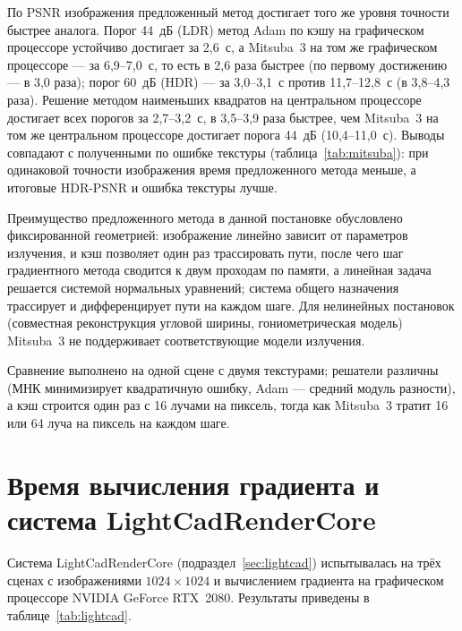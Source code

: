 По PSNR изображения предложенный метод достигает того же уровня точности быстрее аналога. Порог 44~дБ (LDR) метод Adam по кэшу на графическом процессоре устойчиво достигает за 2,6~с, а Mitsuba~3 на том же графическом процессоре --- за 6,9--7,0~с, то есть в 2,6 раза быстрее (по первому достижению --- в 3,0 раза); порог 60~дБ (HDR) --- за 3,0--3,1~с против 11,7--12,8~с (в 3,8--4,3 раза). Решение методом наименьших квадратов на центральном процессоре достигает всех порогов за 2,7--3,2~с, в 3,5--3,9 раза быстрее, чем Mitsuba~3 на том же центральном процессоре достигает порога 44~дБ (10,4--11,0~с). Выводы совпадают с полученными по ошибке текстуры (таблица~\ref{tab:mitsuba}): при одинаковой точности изображения время предложенного метода меньше, а итоговые HDR-PSNR и ошибка текстуры лучше.

Преимущество предложенного метода в данной постановке обусловлено фиксированной геометрией: изображение линейно зависит от параметров излучения, и кэш позволяет один раз трассировать пути, после чего шаг градиентного метода сводится к двум проходам по памяти, а линейная задача решается системой нормальных уравнений; система общего назначения трассирует и дифференцирует пути на каждом шаге. Для нелинейных постановок (совместная реконструкция угловой ширины, гониометрическая модель) Mitsuba~3 не поддерживает соответствующие модели излучения.

Сравнение выполнено на одной сцене с двумя текстурами; решатели различны (МНК минимизирует квадратичную ошибку, Adam --- средний модуль разности), а кэш строится один раз с 16 лучами на пиксель, тогда как Mitsuba~3 тратит 16 или 64 луча на пиксель на каждом шаге.

\section{Время вычисления градиента и система LightCadRenderCore}
\label{sec:lightcad-tests}

Система LightCadRenderCore (подраздел~\ref{sec:lightcad}) испытывалась на трёх сценах с изображениями $1024\times1024$ и вычислением градиента на графическом процессоре NVIDIA GeForce RTX~2080. Результаты приведены в таблице~\ref{tab:lightcad}.


